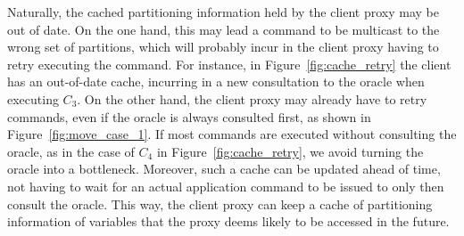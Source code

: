 Naturally, the cached partitioning information held by the client proxy may be out of date.
On the one hand, this may lead a command to be multicast to the wrong set of partitions, which will probably incur in the client proxy having to retry executing the command.
For instance, in Figure~\ref{fig:cache_retry} the client has an out-of-date cache, incurring in a new consultation to the oracle when executing $C_3$.
On the other hand, the client proxy may already have to retry commands, even if the oracle is always consulted first, as shown in Figure~\ref{fig:move_case_1}.
If most commands are executed without consulting the oracle, as in the case of $C_4$ in Figure~\ref{fig:cache_retry}, we avoid turning the oracle into a bottleneck.
Moreover, such a cache can be updated ahead of time, not having to wait for an actual application command to be issued to only then consult the oracle.
This way, the client proxy can keep a cache of partitioning information of variables that the proxy deems likely to be accessed in the future.








